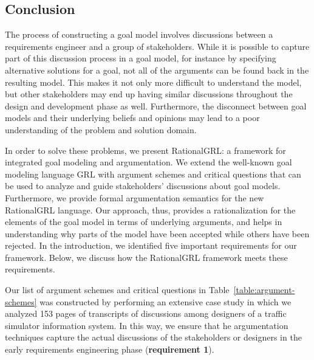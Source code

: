 \subsection{Conclusion}
\label{sect:discussion:conclusion}

The process of constructing a goal model involves discussions between a requirements engineer and a group of stakeholders. While it is possible to capture part of this discussion process in a goal model, for instance by specifying alternative solutions for a goal, not all of the arguments can be found back in the resulting model. This makes it not only more difficult to understand the model, but other stakeholders may end up having similar discussions throughout the design and development phase as well. Furthermore, the disconnect between goal models and their underlying beliefs and opinions may lead to a poor understanding of the problem and solution domain. 

In order to solve these problems, we present RationalGRL: a framework for integrated goal modeling and argumentation. We extend the well-known goal modeling language GRL with argument schemes and critical questions that can be used to analyze and guide stakeholders' discussions about goal models. Furthermore, we provide formal argumentation semantics for the new RationalGRL language. Our approach, thus, provides a rationalization for the elements of the goal model in terms of underlying arguments, and helps in understanding why parts of the model have been accepted while others have been rejected. In the introduction, we identified five important requirements for our framework. Below, we discuss how the RationalGRL framework meets these requirements.

Our list of argument schemes and critical questions in Table~\ref{table:argument-schemes} was constructed by performing an extensive case study in which we analyzed 153 pages of transcripts of discussions among designers of a traffic simulator information system. In this way, we ensure that he argumentation techniques capture the actual discussions of the stakeholders or designers in the early requirements engineering phase (\textbf{requirement 1}).  

